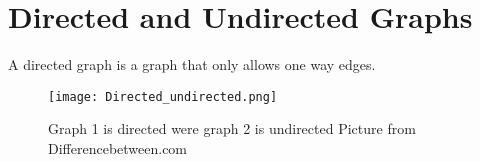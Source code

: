 \section{Directed and Undirected Graphs}
A directed graph is a graph that only allows one way edges. 


\begin{figure}[ht!]
    \centering
    \texttt{[image: Directed\_undirected.png]}
    \label{fig:labeled_Directed_undirected}
    \caption{Graph 1 is directed were graph 2 is undirected \newline Picture from Differencebetween.com\cite{dir_pic}}
  \end{figure}